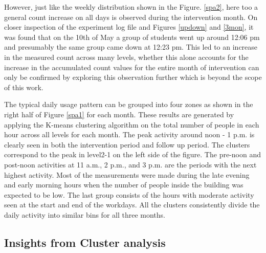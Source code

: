 However, just like the weekly distribution shown in the Figure. \ref{spa2}, here too a general count increase on all days is observed during the intervention month. On closer inspection of the experiment log file and Figures \ref{updown} and \ref{3mon}, it was found that on the 10th of May a group of students went up around 12:06 pm and presumably the same group came down at 12:23 pm. This led to an increase in the measured count across many levels, whether this alone accounts for the increase in the accumulated count values for the entire month of intervention can only be confirmed by exploring this observation further which is beyond the scope of this work.


The typical daily usage pattern can be grouped into four zones as shown in the right half of Figure \ref{spa1} for each month. These results are generated by applying the K-means clustering algorithm on the total number of people in each hour across all levels for each month. The peak activity around noon - 1 p.m. is clearly seen in both the intervention period and follow up period. The clusters correspond to the peak in level2-1 on the left side of the figure. The pre-noon and post-noon activities at 11 a.m., 2 p.m., and 3 p.m. are the periods with the next highest activity. Most of the measurements were made during the late evening and early morning hours when the number of people inside the building was expected to be low. The last group consists of the hours with moderate activity seen at the start and end of the workdays. All the clusters consistently divide the daily activity into similar bins for all three months. 




\subsection{Insights from Cluster analysis}

